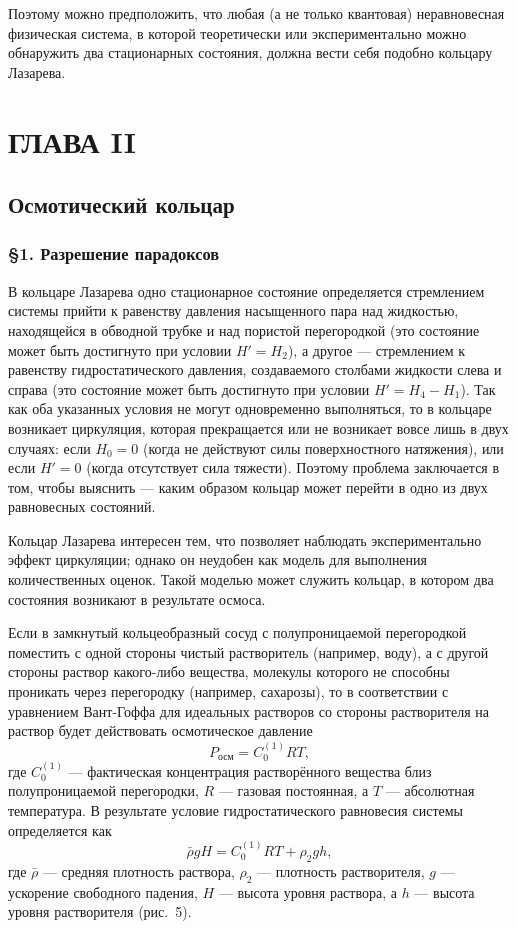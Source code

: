 \documentclass[12pt,a4paper]{article}
\begin{document}
Поэтому можно предположить, что любая (а не только квантовая) неравновесная
физическая система, в которой теоретически или экспериментально можно
обнаружить два стационарных состояния, должна вести себя подобно кольцару
Лазарева.

\newpage
\section*{ГЛАВА II}
\subsection*{Осмотический кольцар}

\subsubsection*{§1. Разрешение парадоксов}

В кольцаре Лазарева одно стационарное состояние определяется стремлением
системы прийти к равенству давления насыщенного пара над жидкостью, находящейся
в обводной трубке и над пористой перегородкой (это состояние может быть
достигнуто при условии $H' = H_2$), а другое — стремлением к равенству
гидростатического давления, создаваемого столбами жидкости слева и справа (это
состояние может быть достигнуто при условии $H' = H_4 - H_1$). Так как оба
указанных условия не могут одновременно выполняться, то в кольцаре возникает
циркуляция, которая прекращается или не возникает вовсе лишь в двух случаях:
если $H_0 = 0$ (когда не действуют силы поверхностного натяжения), или если
$H' = 0$ (когда отсутствует сила тяжести). Поэтому проблема заключается в том,
чтобы выяснить — каким образом кольцар может перейти в одно из двух равновесных
состояний.

Кольцар Лазарева интересен тем, что позволяет наблюдать экспериментально
эффект циркуляции; однако он неудобен как модель для выполнения количественных
оценок. Такой моделью может служить кольцар, в котором два состояния возникают
в результате осмоса.

Если в замкнутый кольцеобразный сосуд с полупроницаемой перегородкой поместить
с одной стороны чистый растворитель (например, воду), а с другой стороны
раствор какого-либо вещества, молекулы которого не способны проникать через
перегородку (например, сахарозы), то в соответствии с уравнением Вант-Гоффа
для идеальных растворов со стороны растворителя на раствор будет действовать
осмотическое давление
\[
P_\text{осм} = C_0^{(1)} RT,
\]
где $C_0^{(1)}$ — фактическая концентрация растворённого вещества близ
полупроницаемой перегородки, $R$ — газовая постоянная, а $T$ — абсолютная
температура. В результате условие гидростатического равновесия системы
определяется как
\begin{equation}
\bar{\rho} g H = C_0^{(1)} RT + \rho_2 g h, \label{eq:3}
\end{equation}
где $\bar{\rho}$ — средняя плотность раствора, $\rho_2$ — плотность
растворителя, $g$ — ускорение свободного падения, $H$ — высота уровня
раствора, а $h$ — высота уровня растворителя (рис.~5).
\end{document}
